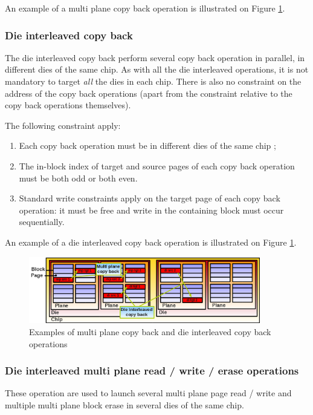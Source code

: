 An example of a multi plane copy back operation is illustrated on Figure \ref{fig:combinedcopyback}.

\subsubsection{Die interleaved copy back}

The die interleaved copy back perform several copy back operation in parallel, in different dies of the same chip. As with all the die interleaved operations, it is not mandatory to target \emph{all} the dies in each chip. There is also no constraint on the address of the copy back operations (apart from the constraint relative to the copy back operations themselves).

The following constraint apply:

\begin{enumerate}
  \item Each copy back operation must be in different dies of the same chip ;
  \item The in-block index of target and source pages of each copy back operation must be both odd or both even.
  \item Standard write constraints apply on the target page of each copy back operation: it must be free and write in the containing block must occur sequentially.
\end{enumerate}

An example of a die interleaved copy back operation is illustrated on Figure \ref{fig:combinedcopyback}.

\begin{figure}
  \center
  \includegraphics[width=0.9\textwidth]{Includes/CombinedCopyBack.png}
  \caption{Examples of multi plane copy back and die interleaved copy back operations}
  \label{fig:combinedcopyback}
\end{figure}

\subsubsection{Die interleaved multi plane read / write / erase operations}
These operation are used to launch several multi plane page read / write and multiple multi plane block erase in several dies of the same chip.

